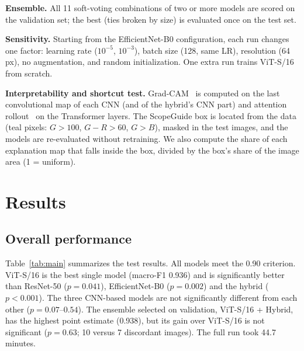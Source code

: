 \documentclass[conference]{IEEEtran}
\begin{document}
\textbf{Ensemble.} All 11 soft-voting combinations of two or more models are scored on the validation set; the best
(ties broken by size) is evaluated once on the test set.

\textbf{Sensitivity.} Starting from the EfficientNet-B0 configuration, each run changes one factor: learning rate
($10^{-5}$, $10^{-3}$), batch size (128, same LR), resolution (64\,px), no augmentation, and random initialization. One
extra run trains ViT-S/16 from scratch.

\textbf{Interpretability and shortcut test.} Grad-CAM~\cite{selvaraju2017gradcam} is computed on the last convolutional
map of each CNN (and of the hybrid's CNN part) and attention rollout~\cite{abnar2020rollout} on the Transformer layers.
The ScopeGuide box is located from the data (teal pixels: $G>100$, $G-R>60$, $G>B$), masked in the test images, and the
models are re-evaluated without retraining. We also compute the share of each explanation map that falls inside the
box, divided by the box's share of the image area (1 = uniform).

\section{Results}
\subsection{Overall performance}
Table~\ref{tab:main} summarizes the test results. All models meet the 0.90 criterion. ViT-S/16 is the best single
model (macro-F1 0.936) and is significantly better than ResNet-50 ($p=0.041$), EfficientNet-B0 ($p=0.002$) and the
hybrid ($p<0.001$). The three CNN-based models are not significantly different from each other ($p=0.07$--$0.54$).
The ensemble selected on validation, ViT-S/16 + Hybrid, has the highest point estimate (0.938), but its gain over
ViT-S/16 is not significant ($p=0.63$; 10 versus 7 discordant images). The full run took 44.7 minutes.
\end{document}
